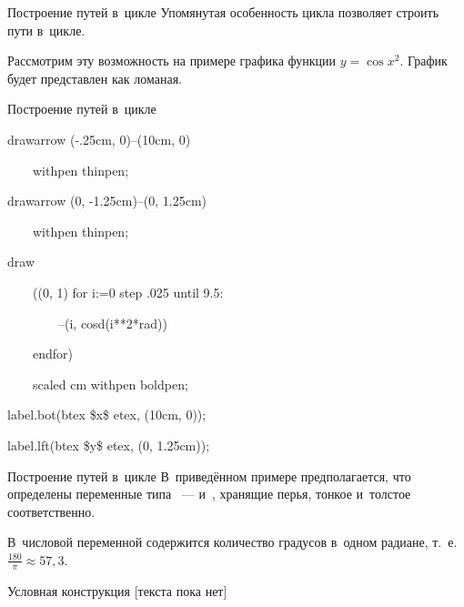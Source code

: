 \begin{frame}{Построение путей в~цикле}
Упомянутая особенность цикла  позволяет строить пути в~цикле.

Рассмотрим эту возможность на примере графика функции $y=\cos x^2$. График
будет представлен как ломаная.
\begin{center}

\end{center}
\end{frame}

\begin{frame}{Построение путей в~цикле}
\begin{programlisting}%
drawarrow (-.25cm, 0)--(10cm, 0)\par
~~~~withpen thinpen;\par
drawarrow (0, -1.25cm)--(0, 1.25cm)\par
~~~~withpen thinpen;\par
\leavevmode\par
draw\par
~~~~((0, 1) for i:=0 step .025 until 9.5:\par
~~~~~~~~--(i, cosd(i**2*rad))\par
~~~~endfor)\par
~~~~scaled cm withpen boldpen;\par
\leavevmode\par
label.bot(btex \$x\$ etex, (10cm, 0));\par
label.lft(btex \$y\$ etex, (0, 1.25cm));
\end{programlisting}
\end{frame}

\begin{frame}{Построение путей в~цикле}
В~приведённом примере предполагается, что определены переменные типа
~—  и~, хранящие перья, тонкое
и~толстое соответственно.

В~числовой переменной  содержится количество градусов в~одном
радиане, т.~е. $\frac{180}\pi\approx57{,}3$.
\end{frame}

\begin{frame}{Условная конструкция [текста пока нет]}
\end{frame}
